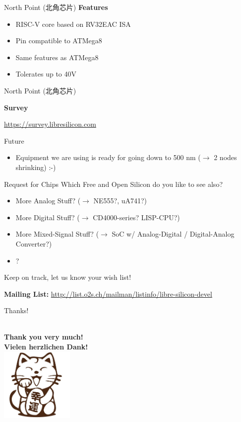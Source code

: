 \documentclass[aspectratio=169]{beamer}
\begin{document}
\begin{frame}{North Point \cjkfont(北角芯片)}
	\textbf{Features}

	\begin{itemize}
		\item RISC-V core based on RV32EAC ISA
		\item Pin compatible to ATMega8
		\item Same features as ATMega8
		\item Tolerates up to 40V
	\end{itemize}
\end{frame}

\begin{frame}{North Point \cjkfont(北角芯片)}
	\begin{center}
		\begingroup
		\huge
		\textbf{Survey}

		\url{https://survey.libresilicon.com}
		\endgroup
	\end{center}
\end{frame}

\begin{frame}{Future}
	\begin{itemize}
        \setlength\itemsep{1em}
		\item Equipment we are using is ready for going down to 500 nm ($\rightarrow$ 2 nodes shrinking) :-)
	\end{itemize}
\end{frame}

\begin{frame}{Request for Chips}
Which Free and Open Silicon do you like to see also?
	\begin{itemize}
		\item More Analog Stuff? ($\rightarrow$ NE555?, uA741?)
		\item More Digital Stuff? ($\rightarrow$ CD4000-series? LISP-CPU?)
		\item More Mixed-Signal Stuff? ($\rightarrow$ SoC w/ Analog-Digital / Digital-Analog Converter?)
		\item ?
	\end{itemize}
Keep on track, let us know your wish list!
	\begin{center}
		\textbf{Mailing List:} \url{http://list.o2s.ch/mailman/listinfo/libre-silicon-devel}
	\end{center}
\end{frame}

\begin{frame}{Thanks!}
	\begin{center}
		\textbf{} \\
		\textbf{Thank you very much!} \\
		\textbf{Vielen herzlichen Dank!} \\
		\includegraphics[width=100pt]{images/cat.png}
	\end{center}
\end{frame}
\end{document}

